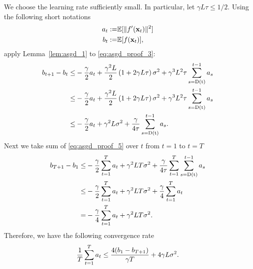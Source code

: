 We choose the learning rate sufficiently small. In particular, let $\gamma L \tau \leq 1/2$.
Using the following short notations
\begin{align*}
a_t := & \mathbb{E}[\|f'({\bf x}_t)\|^2]
\\
b_t := & \mathbb{E}[f({\bf x}_t)],
\end{align*}
apply Lemma~\ref{lem:asgd_1} to \eqref{eq:asgd_proof_3}:
\begin{align}
\nonumber
b_{t+1} - b_t \leq & -{\gamma \over 2} a_t + {\gamma^2 L \over 2}\left(1+2\gamma L \tau\right)\sigma^2 + {\gamma^3L^2\tau} \sum_{s=\rm D(t)}^{t-1} a_s
\\ \nonumber
\leq & -{\gamma \over 2} a_t + {\gamma^2 L \over 2}\left(1+2\gamma L \tau\right)\sigma^2 + {\gamma^3L^2\tau} \sum_{s=\rm D(t)}^{t-1} a_s
\\
\leq & 
-{\gamma \over 2} a_t + {\gamma^2 L}\sigma^2 + {\gamma \over 4\tau} \sum_{s=\rm D(t)}^{t-1} a_s.
\label{eq:asgd_proof_5}
\end{align}
Next we take sum of \eqref{eq:asgd_proof_5} over $t$ from $t=1$ to $t=T$
\begin{align*}
b_{T+1} - b_1 \leq & -{\gamma \over 2} \sum_{t=1}^Ta_t + \gamma^2 LT \sigma^2 + {\gamma \over 4\tau} \sum_{t=1}^T \sum_{s=\rm D(t)}^{t-1}a_s
\\ \leq &
-{\gamma \over 2} \sum_{t=1}^Ta_t + \gamma^2 LT \sigma^2 + {\gamma \over 4} \sum_{t=1}^{T} a_t
\\ = &
- {\gamma \over 4} \sum_{t=1}^T a_t + \gamma^2 LT\sigma^2.
\end{align*}
Therefore, we have the following convergence rate
\begin{align*}
{1\over T}\sum_{t=1}^T a_t \leq {4(b_1 - b_{T+1}) \over \gamma T} + {4\gamma L\sigma^2}.
\end{align*}











